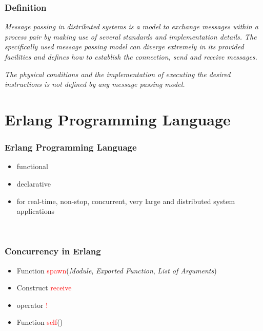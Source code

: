 \documentclass[aspectratio=169]{beamer}
\begin{document}
\begin{frame}

\frametitle{Definition}

\begin{center}
\textit{Message passing in distributed systems is a model to exchange messages within a process pair by making use of several standards and implementation details. The specifically used message passing model can diverge extremely in its provided facilities and defines how to establish the connection, send and receive messages.}
\end{center}
\pause
\begin{center}
\textit{The physical conditions and the implementation of executing the desired instructions is not defined by any message passing model.}
\end{center}

\end{frame}

\section{Erlang Programming Language}

\begin{frame}

\frametitle{Erlang Programming Language}

\begin{itemize}
\item functional
\pause
\item declarative
\pause
\item for real-time, non-stop, concurrent, very large and distributed system applications
\end{itemize}

\begin{flushright}
\cite{Armstrong96erlang}\\
\cite{erl_history}
\end{flushright}

\end{frame}

\begin{frame}

\frametitle{Concurrency in Erlang}

\begin{itemize}

\item Function \textcolor{red}{spawn}(\textit{Module}, \textit{Exported Function}, \textit{List of Arguments})
\pause
\item Construct \textcolor{red}{receive}
\pause
\item operator \textcolor{red}{!}
\pause
\item Function \textcolor{red}{self}()

\end{itemize}

\begin{flushright}
\cite{erl_doc}\\
\cite{erl}
\end{flushright}

\end{frame}
\end{document}
